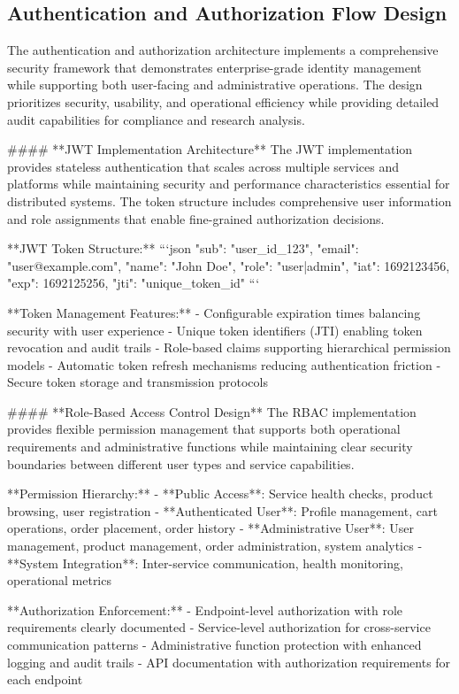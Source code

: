 \subsection{Authentication and Authorization Flow Design}

The authentication and authorization architecture implements a comprehensive security framework that demonstrates enterprise-grade identity management while supporting both user-facing and administrative operations. The design prioritizes security, usability, and operational efficiency while providing detailed audit capabilities for compliance and research analysis.

#### **JWT Implementation Architecture**
The JWT implementation provides stateless authentication that scales across multiple services and platforms while maintaining security and performance characteristics essential for distributed systems. The token structure includes comprehensive user information and role assignments that enable fine-grained authorization decisions.

**JWT Token Structure:**
```json
{
  "sub": "user_id_123",
  "email": "user@example.com", 
  "name": "John Doe",
  "role": "user|admin",
  "iat": 1692123456,
  "exp": 1692125256,
  "jti": "unique_token_id"
}
```

**Token Management Features:**
- Configurable expiration times balancing security with user experience
- Unique token identifiers (JTI) enabling token revocation and audit trails
- Role-based claims supporting hierarchical permission models
- Automatic token refresh mechanisms reducing authentication friction
- Secure token storage and transmission protocols

#### **Role-Based Access Control Design**
The RBAC implementation provides flexible permission management that supports both operational requirements and administrative functions while maintaining clear security boundaries between different user types and service capabilities.

**Permission Hierarchy:**
- **Public Access**: Service health checks, product browsing, user registration
- **Authenticated User**: Profile management, cart operations, order placement, order history
- **Administrative User**: User management, product management, order administration, system analytics
- **System Integration**: Inter-service communication, health monitoring, operational metrics

**Authorization Enforcement:**
- Endpoint-level authorization with role requirements clearly documented
- Service-level authorization for cross-service communication patterns
- Administrative function protection with enhanced logging and audit trails
- API documentation with authorization requirements for each endpoint

